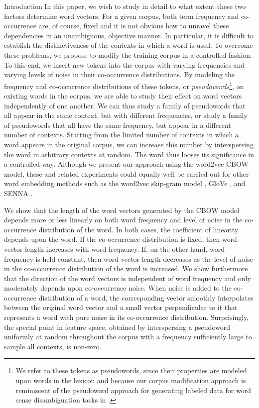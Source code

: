 \documentclass{article} %
\begin{document}
\begin{section}{Introduction}
In this paper, we wish to study in detail to what extent these two
factors determine word vectors.  For a given corpus, both term
frequency and co-occurrence are, of course, fixed and it is not obvious
how to unravel these dependencies in an unambiguous, objective manner.
In particular, it is difficult to establish the distinctiveness of the
contexts in which a word is used.  To overcome these problems, we
propose to modify the training corpus in a controlled fashion.  To
this end, we insert new tokens into the corpus with varying frequencies and
varying levels of noise in their co-occurrence distributions.  By modeling the
frequency and co-occurrence distributions of these tokens, or 
\textit{pseudowords}\footnote{We refer to these tokens as
pseudowords, since their properties are modeled upon words in the
lexicon and because our corpus modification approach is reminiscent of the
pseudoword approach for generating labeled data for word sense disambiguation
tasks in \cite{gale1992work}.}, on existing words in the corpus, we are able to
study their effect on word vectors independently of one another.  We can thus
study a family of pseudowords that all appear in the same context, but with
different frequencies, or study a family of pseudowords that all have the same
frequency, but appear in a different number of contexts.  Starting from the
limited number of contexts in which a word appears in the original corpus, we
can increase this number by interspersing the word in arbitrary contexts at
random.  The word thus looses its significance in a controlled way.  Although
we present our approach using the word2vec CBOW model, these and related
experiments could equally well be carried out for other word embedding methods
such as the word2vec skip-gram model \cite{DistRepns,EfficientEstimation},
GloVe \cite{pennington2014glove}, and SENNA \cite{collobert-2011}.

We show that the length of the word vectors generated by the CBOW model
depends more or less linearly on both word frequency and level of noise
in the co-occurrence distribution of the word.  In both cases, the
coefficient of linearity depends upon the word.  If the co-occurrence
distribution is fixed, then word vector length increases with word
frequency.  If, on the other hand, word frequency is held constant, then
word vector length decreases as the level of noise in the co-occurrence
distribution of the word is increased.  We show furthermore that the
direction of the word vectors is independent of word frequency and only
moderately depends upon co-occurrence noise.  When noise is added to the
co-occurrence distribution of a word, the corresponding vector smoothly
interpolates between the original word vector and a small vector
perpendicular to it that represents a word with pure noise in its
co-occurrence distribution.  Surprisingly, the special point in feature
space, obtained by interspersing a pseudoword uniformly at random
throughout the corpus with a frequency sufficiently large to sample all
contexts, is non-zero.


\end{section}
\end{document}
